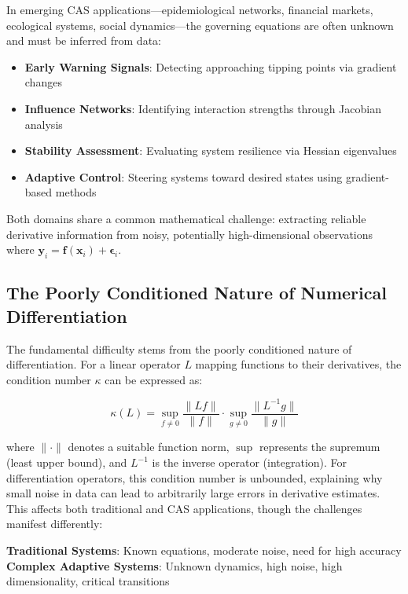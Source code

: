 \documentclass[10pt,journal,compsoc]{IEEEtran}
\begin{document}
In emerging CAS applications---epidemiological networks, financial markets, ecological systems, social dynamics---the governing equations are often unknown and must be inferred from data:
\begin{itemize}
    \item \textbf{Early Warning Signals}: Detecting approaching tipping points via gradient changes
    \item \textbf{Influence Networks}: Identifying interaction strengths through Jacobian analysis
    \item \textbf{Stability Assessment}: Evaluating system resilience via Hessian eigenvalues
    \item \textbf{Adaptive Control}: Steering systems toward desired states using gradient-based methods
\end{itemize}

Both domains share a common mathematical challenge: extracting reliable derivative information from noisy, potentially high-dimensional observations where $\mathbf{y}_i = \mathbf{f}(\mathbf{x}_i) + \boldsymbol{\epsilon}_i$.

\subsection{The Poorly Conditioned Nature of Numerical Differentiation}

The fundamental difficulty stems from the poorly conditioned nature of differentiation. For a linear operator $L$ mapping functions to their derivatives, the condition number $\kappa$ can be expressed as:

\begin{equation}
\kappa(L) = \sup_{f \neq 0} \frac{\|Lf\|}{\|f\|} \cdot \sup_{g \neq 0} \frac{\|L^{-1}g\|}{\|g\|}
\end{equation}

where $\|\cdot\|$ denotes a suitable function norm, $\sup$ represents the supremum (least upper bound), and $L^{-1}$ is the inverse operator (integration). For differentiation operators, this condition number is unbounded, explaining why small noise in data can lead to arbitrarily large errors in derivative estimates. This affects both traditional and CAS applications, though the challenges manifest differently:

\textbf{Traditional Systems}: Known equations, moderate noise, need for high accuracy\\
\textbf{Complex Adaptive Systems}: Unknown dynamics, high noise, high dimensionality, critical transitions
\end{document}
